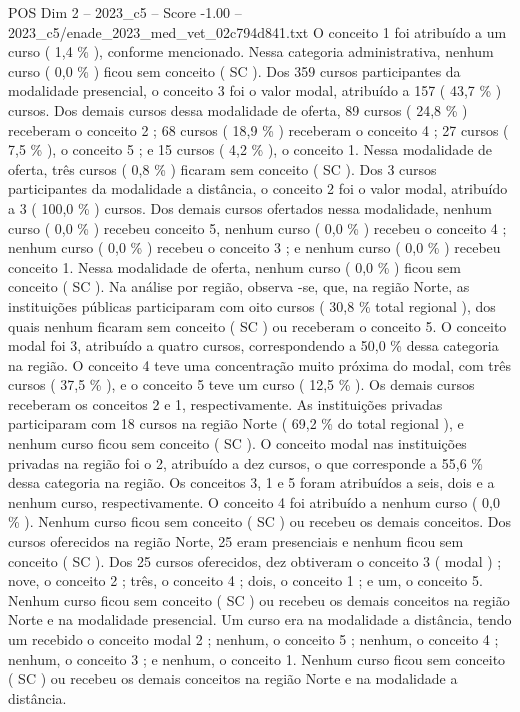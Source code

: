\begin{textsample}{POS Dim 2 – 2023\_c5 – Score -1.00 – 2023\_c5/enade\_2023\_med\_vet\_02c794d841.txt}
O conceito 1 foi atribuído a um curso ( 1,4 \% ), conforme mencionado.
Nessa categoria administrativa, nenhum curso ( 0,0 \% ) ficou sem conceito ( SC ).
Dos 359 cursos participantes da modalidade presencial, o conceito 3 foi o valor modal, atribuído a 157 ( 43,7 \% ) cursos.
Dos demais cursos dessa modalidade de oferta, 89 cursos ( 24,8 \% ) receberam o conceito 2 ; 68 cursos ( 18,9 \% ) receberam o conceito 4 ; 27 cursos ( 7,5 \% ), o conceito 5 ; e 15 cursos ( 4,2 \% ), o conceito 1.
Nessa modalidade de oferta, três cursos ( 0,8 \% ) ficaram sem conceito ( SC ).
Dos 3 cursos participantes da modalidade a distância, o conceito 2 foi o valor modal, atribuído a 3 ( 100,0 \% ) cursos.
Dos demais cursos ofertados nessa modalidade, nenhum curso ( 0,0 \% ) recebeu conceito 5, nenhum curso ( 0,0 \% ) recebeu o conceito 4 ; nenhum curso ( 0,0 \% ) recebeu o conceito 3 ; e nenhum curso ( 0,0 \% ) recebeu conceito 1.
Nessa modalidade de oferta, nenhum curso ( 0,0 \% ) ficou sem conceito ( SC ).
Na análise por região, observa -se, que, na região Norte, as instituições públicas participaram com oito cursos ( 30,8 \% total regional ), dos quais nenhum ficaram sem conceito ( SC ) ou receberam o conceito 5.
O conceito modal foi 3, atribuído a quatro cursos, correspondendo a 50,0 \% dessa categoria na região.
O conceito 4 teve uma concentração muito próxima do modal, com três cursos ( 37,5 \% ), e o conceito 5 teve um curso ( 12,5 \% ).
Os demais cursos receberam os conceitos 2 e 1, respectivamente.
As instituições privadas participaram com 18 cursos na região Norte ( 69,2 \% do total regional ), e nenhum curso ficou sem conceito ( SC ).
O conceito modal nas instituições privadas na região foi o 2, atribuído a dez cursos, o que corresponde a 55,6 \% dessa categoria na região.
Os conceitos 3, 1 e 5 foram atribuídos a seis, dois e a nenhum curso, respectivamente.
O conceito 4 foi atribuído a nenhum curso ( 0,0 \% ).
Nenhum curso ficou sem conceito ( SC ) ou recebeu os demais conceitos.
Dos cursos oferecidos na região Norte, 25 eram presenciais e nenhum ficou sem conceito ( SC ).
Dos 25 cursos oferecidos, dez obtiveram o conceito 3 ( modal ) ; nove, o conceito 2 ; três, o conceito 4 ; dois, o conceito 1 ; e um, o conceito 5.
Nenhum curso ficou sem conceito ( SC ) ou recebeu os demais conceitos na região Norte e na modalidade presencial.
Um curso era na modalidade a distância, tendo um recebido o conceito modal 2 ; nenhum, o conceito 5 ; nenhum, o conceito 4 ; nenhum, o conceito 3 ; e nenhum, o conceito 1.
Nenhum curso ficou sem conceito ( SC ) ou recebeu os demais conceitos na região Norte e na modalidade a distância.

\end{textsample}
